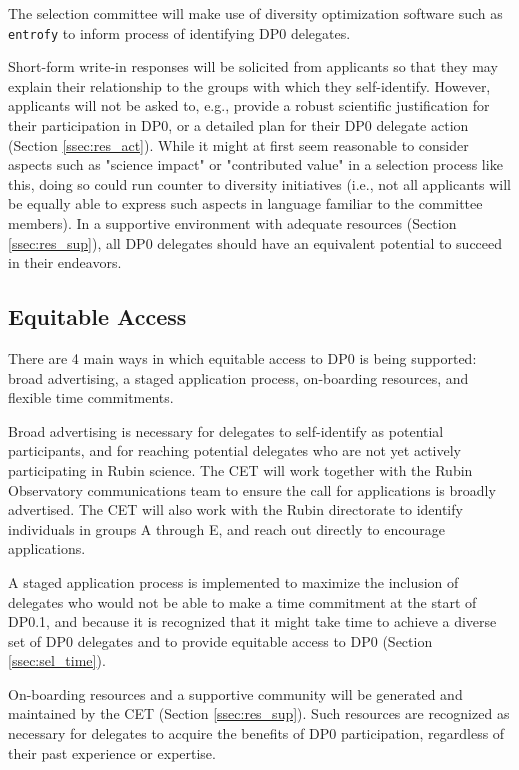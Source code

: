 \documentclass[DM,lsstdraft,authoryear,toc]{lsstdoc}
\begin{document}
The selection committee will make use of diversity optimization software such as {\tt entrofy} \citep{2019arXiv190503314H} to inform process of identifying DP0 delegates.

Short-form write-in responses will be solicited from applicants so that they may explain their relationship to the groups with which they self-identify.
However, applicants will not be asked to, e.g., provide a robust scientific justification for their participation in DP0, or a detailed plan for their DP0 delegate action (Section \ref{ssec:res_act}).
While it might at first seem reasonable to consider aspects such as "science impact" or "contributed value" in a selection process like this, doing so could run counter to diversity initiatives (i.e., not all applicants will be equally able to express such aspects in language familiar to the committee members).
In a supportive environment with adequate resources (Section \ref{ssec:res_sup}), all DP0 delegates should have an equivalent potential to succeed in their endeavors.


\subsection{Equitable Access}\label{ssec:sel_equity}

There are 4 main ways in which equitable access to DP0 is being supported: broad advertising, a staged application process, on-boarding resources, and flexible time commitments.

Broad advertising is necessary for delegates to self-identify as potential participants, and for reaching potential delegates who are not yet actively participating in Rubin science.
The CET will work together with the Rubin Observatory communications team to ensure the call for applications is broadly advertised. 
The CET will also work with the Rubin directorate to identify individuals in groups A through E, and reach out directly to encourage applications. 

A staged application process is implemented to maximize the inclusion of delegates who would not be able to make a time commitment at the start of DP0.1, and because it is recognized that it might take time to achieve a diverse set of DP0 delegates and to provide equitable access to DP0 (Section \ref{ssec:sel_time}).

On-boarding resources and a supportive community will be generated and maintained by the CET (Section \ref{ssec:res_sup}).
Such resources are recognized as necessary for delegates to acquire the benefits of DP0 participation, regardless of their past experience or expertise.
\end{document}
